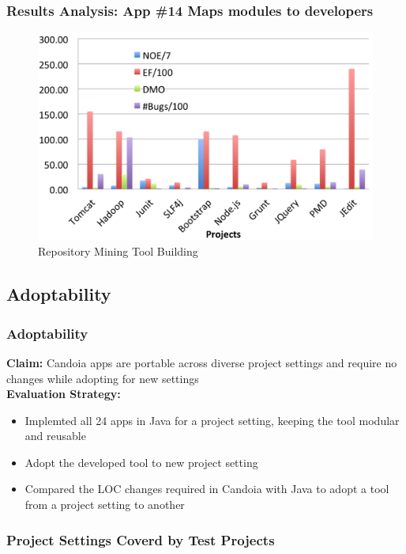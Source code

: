         \begin{frame}
            \frametitle{Results Analysis: App \#14 Maps modules to developers}
                \begin{figure}
                    \centering
                    \includegraphics[scale=0.2]{figures/code-churn-metrics.png}
                    \caption{Repository Mining Tool Building}
                \end{figure}
        \end{frame}

    \subsection{Adoptability}
        \begin{frame}
            \frametitle{Adoptability}
            \textbf{Claim:}  Candoia apps are portable across diverse project settings and require no changes while adopting for new settings\\
            \textbf{Evaluation Strategy:}
            \begin{itemize}
                \item Implemted all 24 apps in Java for a project setting, keeping the tool modular and reusable
                \item Adopt the developed tool to new project setting
                \item Compared the LOC changes required in Candoia with Java to adopt a tool from a
                 project setting to another
            \end{itemize}
         \end{frame}

        \begin{frame}
            \frametitle{Project Settings Coverd by Test Projects}
            
         \end{frame}

